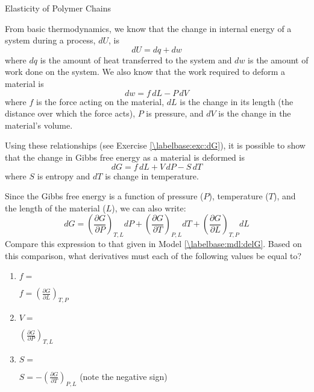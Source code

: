 \begin{activity}{Elasticity of Polymer Chains}
\begin{model}
	From basic thermodynamics, we know that the change in internal energy of a system during a process, $dU$, is
	\begin{equation*}
		dU = dq + dw
	\end{equation*}
	where $dq$ is the amount of heat transferred to the system and $dw$ is the amount of work done on the system.  We also know that the work required to deform a material is
	\begin{equation*}
		dw = f\,dL - P\,dV
	\end{equation*}
	where $f$ is the force acting on the material, $dL$ is the change in its length (the distance over which the force acts), $P$ is pressure, and $dV$ is the change in the material's volume.
	
	Using these relationships (see Exercise \ref{\labelbase:exc:dG}), it is possible to show that the change in Gibbs free energy as a material is deformed is
	\begin{equation*}
		dG = f\,dL + V\,dP - S\,dT
	\end{equation*}
	where $S$ is entropy and $dT$ is change in temperature.

\end{model}


\begin{ctqs}

	\question Since the Gibbs free energy is a function of pressure ($P$), temperature ($T$), and the length of the material ($L$), we can also write:
		\begin{equation*}
				dG = \left(\frac{\partial G}{\partial P}\right)_{T,L}dP + 
					\left(\frac{\partial G}{\partial T}\right)_{P,L}dT +
					\left(\frac{\partial G}{\partial L}\right)_{T,P}dL
			\end{equation*}
		Compare this expression to that given in Model \ref{\labelbase:mdl:delG}.  Based on this comparison, what derivatives must each of the following values be equal to?
	
		\begin{enumerate}
			\item $f=$ \label{\labelbase:ctq:fderiv}
				\begin{solution}[0.25in]{}
					$f = \left(\frac{\partial G}{\partial L}\right)_{T,P}$
				\end{solution}
			\item $V=$
				\begin{solution}[0.25in]{}
					$\left(\frac{\partial G}{\partial P}\right)_{T,L}$
				\end{solution}
			\item $S=$
				\begin{solution}[0.25in]{}
					$S=  -\left(\frac{\partial G}{\partial T}\right)_{P,L}$ (note the negative sign)
				\end{solution}
		\end{enumerate}
		

\end{ctqs}
\end{activity}
